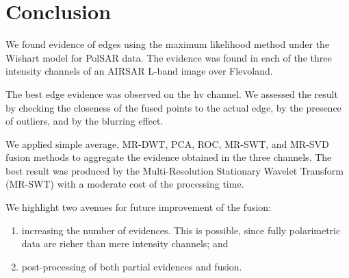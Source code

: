 \documentclass[journal]{IEEEtran}
\begin{document}
\section{Conclusion}\label{sec_06}

We found evidence of edges using the maximum likelihood method under the Wishart model for PolSAR data. 
The evidence was found in each of the three intensity channels of an AIRSAR L-band image over Flevoland.

The best edge evidence was observed on the hv channel. We assessed the result by checking the closeness of the fused points to the actual edge, by the presence of outliers, and by the blurring effect.

We applied simple average, MR-DWT, PCA, ROC, MR-SWT, and MR-SVD fusion methods to aggregate the evidence obtained in the three channels.
The best result was produced by the Multi-Resolution Stationary Wavelet Transform (MR-SWT) with a moderate cost of the processing time.

We highlight two avenues for future improvement of the fusion:
\begin{enumerate}
	\item increasing the number of evidences.
	This is possible, since fully polarimetric data are richer than mere intensity channels; and
	\item post-processing of both partial evidences and fusion.
\end{enumerate}



\end{document}
